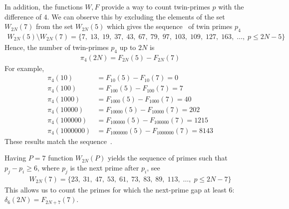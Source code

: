 In addition, the functions $W, F$ provide a way to count twin-primes $p$ with the difference of $4$.
We can observe this by excluding the elements of the set $W_{2N}(7)$ from the set $W_{2N}(5)$ which gives
the sequence~\cite{oeis:A023200} of twin primes $p_4$
\begin{align*}
    W_{2N}(5) \setminus W_{2N}(7) = \{ 7, \; 13, \; 19, \; 37, \; 43, \; 67, \; 79, \; 97, \; 103, \; 109, \; 127, \; 163, \; \dots, \;  p \leq 2N - 5 \}
\end{align*}
Hence, the number of twin-primes $p_4$ up to $2N$ is
\begin{align*}
    \pi_4 (2N) = F_{2N}(5) - F_{2N}(7)
\end{align*}
For example,
\begin{align*}
    \pi_4 (10) &= F_{10}(5) - F_{10}(7) = 0 \\
    \pi_4 (100) &= F_{100}(5) - F_{100}(7) = 7 \\
    \pi_4 (1000) &= F_{1000}(5) - F_{1000}(7) = 40 \\
    \pi_4 (10000) &= F_{10000}(5) - F_{10000}(7) = 202 \\
    \pi_4 (100000) &= F_{100000}(5) - F_{100000}(7) = 1215 \\
    \pi_4 (1000000) &= F_{1000000}(5) - F_{1000000}(7) = 8143
\end{align*}
These results match the sequence~\cite{oeis:A093737}.

Having $P=7$ function $W_{2N}(P)$ yields the sequence of primes such that $p_j-p_i \geq 6$,
where $p_j$ is the next prime after $p_i$, see~\cite{oeis:A124582}
\begin{align*}
    W_{2N}(7) = \{ 23, \; 31, \;  47, \; 53, \; 61, \;  73, \; 83, \; 89, \; 113, \; \dots, \; p \leq 2N-7 \}
\end{align*}
This allows us to count the primes for which the next-prime gap at least 6: $\delta_6(2N) = F_{2N+7}(7)$.

